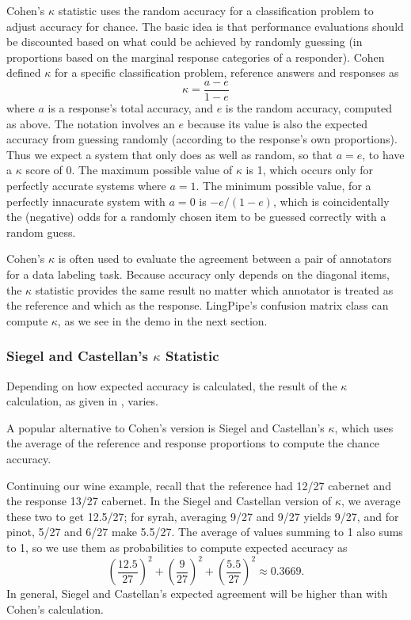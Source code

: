 Cohen's $\kappa$ statistic uses the random accuracy for a
classification problem to adjust accuracy for chance.%
%
%
The basic idea is that performance evaluations should be discounted
based on what could be achieved by randomly guessing (in proportions
based on the marginal response categories of a responder).  Cohen
defined $\kappa$ for a specific classification problem, reference
answers and responses as
%
\begin{equation}\label{eq:kappa-statistic}
\kappa = \frac{a - e}{1 - e}
\end{equation}
%
where $a$ is a response's total accuracy, and $e$ is the random
accuracy, computed as above.  The notation involves an $e$ because its
value is also the expected accuracy from guessing randomly (according
to the response's own proportions).  Thus we expect a system that only
does as well as random, so that $a = e$, to have a $\kappa$ score of
0.  The maximum possible value of $\kappa$ is 1, which occurs only for
perfectly accurate systems where $a = 1$.  The minimum possible value,
for a perfectly innacurate system with $a = 0$ is $-e/(1-e)$, which is
coincidentally the (negative) odds for a randomly chosen item to be
guessed correctly with a random guess.

Cohen's $\kappa$ is often used to evaluate the agreement between a
pair of annotators for a data labeling task.  Because accuracy only
depends on the diagonal items, the $\kappa$ statistic provides the
same result no matter which annotator is treated as the reference and
which as the response.  LingPipe's confusion matrix class can compute
$\kappa$, as we see in the demo in the next section.

\subsubsection{Siegel and Castellan's $\kappa$ Statistic}

Depending on how expected accuracy is calculated, the result of the
$\kappa$ calculation, as given in , varies.

A popular alternative to Cohen's version is Siegel and Castellan's
$\kappa$, 
%
%
which uses the average of the reference and response
proportions to compute the chance accuracy.  

Continuing our wine example, recall that the reference had 12/27
cabernet and the response 13/27 cabernet.  In the Siegel and Castellan
version of $\kappa$, we average these two to get 12.5/27; for syrah,
averaging 9/27 and 9/27 yields 9/27, and for pinot, 5/27 and 6/27 make
5.5/27.  The average of values summing to 1 also sums to 1, so we use
them as probabilities to compute expected accuracy as
%
\begin{equation}
\left( \frac{12.5}{27} \right)^2
+ \left( \frac{9}{27} \right)^2
+ \left( \frac{5.5}{27} \right)^2
\approx 0.3669.
\end{equation}
%
In general, Siegel and Castellan's expected agreement will be higher
than with Cohen's calculation.


